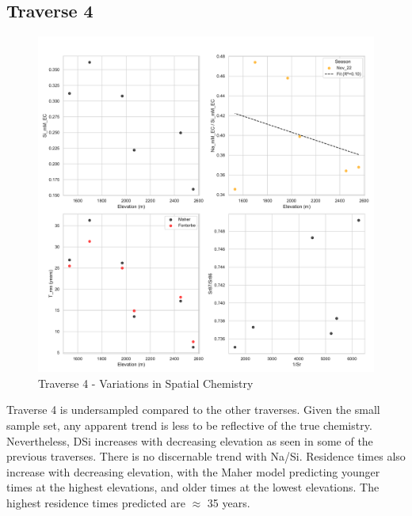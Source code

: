\subsection{Traverse 4}

\begin{figure}[h]
    \centering
        \includegraphics[width=\textwidth]{Traverse_4_summary.pdf}
    \caption{Traverse 4 - Variations in Spatial Chemistry}
    \label{fig:spatial_changes_spring4}
\end{figure}

\FloatBarrier

Traverse 4 is undersampled compared to the other traverses. Given the small sample set, any apparent trend is less to be reflective of the true chemistry. Nevertheless, DSi increases with decreasing elevation as seen in some of the previous traverses. There is no discernable trend with Na/Si. Residence times also increase with decreasing elevation, with the Maher model predicting younger times at the highest elevations, and older times at the lowest elevations. The highest residence times predicted are $\approx$ 35 years.


\newpage

